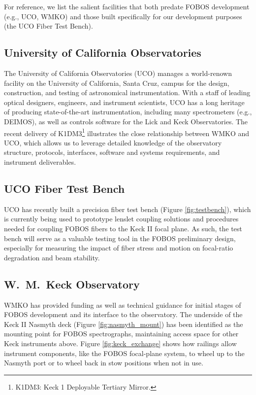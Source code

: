 \documentclass[oneside,11pt]{amsart}
\begin{document}
\noindent For reference, we list the salient facilities that both
predate FOBOS development (e.g., UCO, WMKO) and those built specifically
for our development purposes (the UCO Fiber Test Bench).

\subsection{University of California Observatories}

The University of California Observatories (UCO) manages a world-renown
facility on the University of California, Santa Cruz, campus for the
design, construction, and testing of astronomical instrumentation.  With
a staff of leading optical designers, engineers, and instrument
scientists, UCO has a long heritage of producing state-of-the-art
instrumentation, including many spectrometers (e.g., DEIMOS), as well as
controls software for the Lick and Keck Observatories.  The recent
delivery of K1DM3\footnote{K1DM3: Keck 1 Deployable Tertiary Mirror.}
illustrates the close relationship between WMKO and UCO, which allows us
to leverage detailed knowledge of the observatory structure, protocols,
interfaces, software and systems requirements, and instrument
deliverables.

\subsection{UCO Fiber Test Bench}

UCO has recently built a precision fiber test bench (Figure
\ref{fig:testbench}), which is currently being used to prototype lenslet
coupling solutions and procedures needed for coupling FOBOS fibers to
the Keck II focal plane.  As such, the test bench will serve as a
valuable testing tool in the FOBOS preliminary design, especially for
measuring the impact of fiber stress and motion on focal-ratio
degradation and beam stability.

\subsection{W.~M.~Keck Observatory}

WMKO has provided funding as well as technical guidance for initial
stages of FOBOS development and its interface to the observatory.  The
underside of the Keck II Nasmyth deck (Figure \ref{fig:nasmyth_mount})
has been identified as the mounting point for FOBOS spectrographs,
maintaining access space for other Keck instruments above.  Figure
\ref{fig:keck_exchange} shows how railings allow instrument components,
like the FOBOS focal-plane system, to wheel up to the Nasmyth port or to
wheel back in stow positions when not in use.
\end{document}
